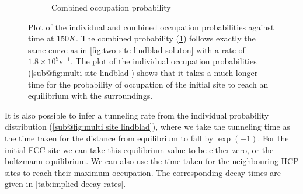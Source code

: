 \begin{figure}[htbp]
\begin{subfigure}{0.45\linewidth}
        \caption{Combined occupation probability
        }\label{sub@fig:multi site combined lindblad}
    \end{subfigure}
    \caption{Plot of the individual and combined
    occupation probabilities against time at
    \(150K\). The combined
    probability
    (\cref{sub@fig:multi site combined lindblad})
    follows exactly the same curve as in
    \cref{fig:two site lindblad soluton}
    with a rate of \(1.8\times{}10^{9}s^{-1}\).
    The plot of the individual occupation
    probabilities
    (\cref{sub@fig:multi site lindblad})
    shows that it takes
    a much longer time for the
    probability of occupation of the
    initial site to reach
    an equilibrium with the surroundings.}\label{fig:multi site lindblad}
\end{figure}
It is also possible to infer a
tunneling rate from the
individual probability
distribution
(\cref{sub@fig:multi site lindblad}),
where we take the tunneling
time as the time taken for the
distance from equilibrium
to fall by \(\exp{(-1)}\).
For the initial
FCC site we can
take this equilibrium
value to be either zero,
or the boltzmann equilibrium.
We can also
use the time taken for the
neighbouring HCP sites to
reach their maximum occupation.
The corresponding decay times are
given in \cref{tab:implied decay rates}.

